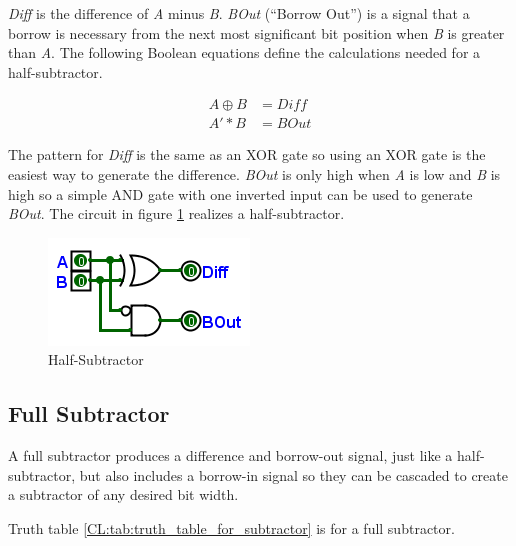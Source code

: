 \emph{Diff} is the difference of \emph{A} minus \emph{B}. \emph{BOut} (``Borrow Out'') is a signal that a borrow is necessary from the next most significant bit position when \emph{B} is greater than \emph{A}. The following Boolean equations define the calculations needed for a half-subtractor.

\begin{align}
\label{CL:eq:half_subtractor}
	A \oplus B &= Diff \\
	\nonumber
	A' * B &= BOut
\end{align}

The pattern for \emph{Diff} is the same as an \textsf{XOR} gate so using an \textsf{XOR} gate is the easiest way to generate the difference. \emph{BOut} is only high when \emph{A} is low and \emph{B} is high so a simple \textsf{AND} gate with one inverted input can be used to generate \emph{BOut}. The circuit in figure \ref{fig:08_08} realizes a half-subtractor.

\begin{figure}[H]
	\centering
	\includegraphics[width=\maxwidth{.95\linewidth}]{gfx/08_08}
	\caption{Half-Subtractor}
	\label{fig:08_08}
\end{figure}

\subsection{Full Subtractor}
\label{CL:subsec:full_subtractor}

A full subtractor produces a difference and borrow-out signal, just like a half-subtractor, but also includes a borrow-in signal so they can be cascaded to create a subtractor of any desired bit width.

Truth table \ref{CL:tab:truth_table_for_subtractor} is for a full subtractor. 

